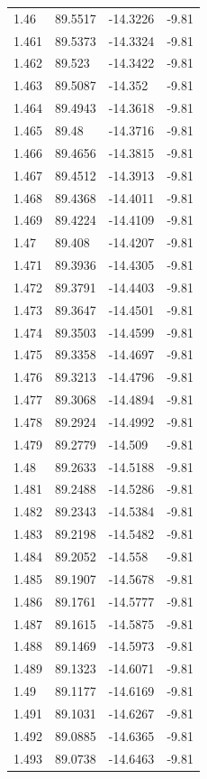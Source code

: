 \begin{tabular}{llll}
1.46 & 89.5517 & -14.3226 & -9.81 \\
1.461 & 89.5373 & -14.3324 & -9.81 \\
1.462 & 89.523 & -14.3422 & -9.81 \\
1.463 & 89.5087 & -14.352 & -9.81 \\
1.464 & 89.4943 & -14.3618 & -9.81 \\
1.465 & 89.48 & -14.3716 & -9.81 \\
1.466 & 89.4656 & -14.3815 & -9.81 \\
1.467 & 89.4512 & -14.3913 & -9.81 \\
1.468 & 89.4368 & -14.4011 & -9.81 \\
1.469 & 89.4224 & -14.4109 & -9.81 \\
1.47 & 89.408 & -14.4207 & -9.81 \\
1.471 & 89.3936 & -14.4305 & -9.81 \\
1.472 & 89.3791 & -14.4403 & -9.81 \\
1.473 & 89.3647 & -14.4501 & -9.81 \\
1.474 & 89.3503 & -14.4599 & -9.81 \\
1.475 & 89.3358 & -14.4697 & -9.81 \\
1.476 & 89.3213 & -14.4796 & -9.81 \\
1.477 & 89.3068 & -14.4894 & -9.81 \\
1.478 & 89.2924 & -14.4992 & -9.81 \\
1.479 & 89.2779 & -14.509 & -9.81 \\
1.48 & 89.2633 & -14.5188 & -9.81 \\
1.481 & 89.2488 & -14.5286 & -9.81 \\
1.482 & 89.2343 & -14.5384 & -9.81 \\
1.483 & 89.2198 & -14.5482 & -9.81 \\
1.484 & 89.2052 & -14.558 & -9.81 \\
1.485 & 89.1907 & -14.5678 & -9.81 \\
1.486 & 89.1761 & -14.5777 & -9.81 \\
1.487 & 89.1615 & -14.5875 & -9.81 \\
1.488 & 89.1469 & -14.5973 & -9.81 \\
1.489 & 89.1323 & -14.6071 & -9.81 \\
1.49 & 89.1177 & -14.6169 & -9.81 \\
1.491 & 89.1031 & -14.6267 & -9.81 \\
1.492 & 89.0885 & -14.6365 & -9.81 \\
1.493 & 89.0738 & -14.6463 & -9.81 \\

\end{tabular}
